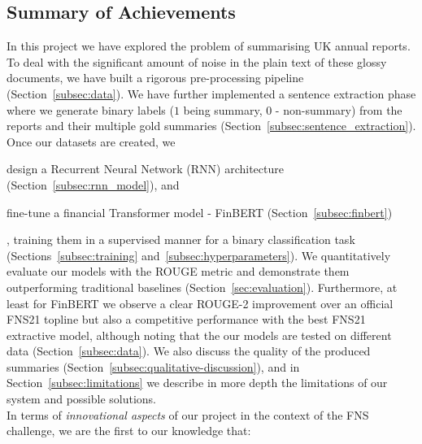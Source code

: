 \subsection{Summary of Achievements}\label{subsec:summary}
In this project we have explored the problem of summarising UK annual reports.
To deal with the significant amount of noise in the plain text of these glossy documents, we have built a rigorous pre-processing pipeline (Section~\ref{subsec:data}).
We have further implemented a sentence extraction phase where we generate binary labels ($1$ being summary, $0$ - non-summary) from the reports and their multiple gold summaries (Section~\ref{subsec:sentence_extraction}).
Once our datasets are created, we
\begin{enumerate*}
    \item design a Recurrent Neural Network (RNN) architecture (Section~\ref{subsec:rnn_model}), and
    \item fine-tune a financial Transformer model - FinBERT (Section~\ref{subsec:finbert})
\end{enumerate*},
training them in a supervised manner for a binary classification task (Sections~\ref{subsec:training} and~\ref{subsec:hyperparameters}).
We quantitatively evaluate our models with the ROUGE metric and demonstrate them outperforming traditional baselines (Section~\ref{sec:evaluation}).
Furthermore, at least for FinBERT we observe a clear ROUGE-2 improvement over an official FNS21 topline but also a
competitive performance with the best FNS21 extractive model, although noting that the our models are tested on different data (Section~\ref{subsec:data}).
We also discuss the quality of the produced summaries (Section~\ref{subsec:qualitative-discussion}), and in
Section~\ref{subsec:limitations} we describe in more depth the limitations of our system and possible solutions.
\\
In terms of \emph{innovational aspects} of our project in the context of the FNS challenge, we are the first to our knowledge that:
